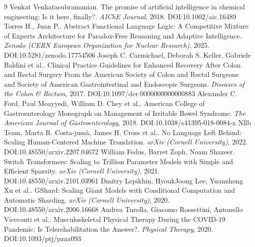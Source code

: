 \documentclass[11pt]{article}
\begin{document}
\begin{thebibliography}{9}
 Venkat Venkatasubramanian. The promise of artificial intelligence in chemical engineering: Is it here, finally?. \emph{AIChE Journal}, 2018. DOI:10.1002/aic.16489
 Torres H., Juan P.. Abstract Functional Language Logic: A Competitive Mixture of Experts Architecture for Paradox-Free Reasoning and Adaptive Intelligence. \emph{Zenodo (CERN European Organization for Nuclear Research)}, 2025. DOI:10.5281/zenodo.17754506
 Joseph C. Carmichael, Deborah S. Keller, Gabriele Baldini et al.. Clinical Practice Guidelines for Enhanced Recovery After Colon and Rectal Surgery From the American Society of Colon and Rectal Surgeons and Society of American Gastrointestinal and Endoscopic Surgeons. \emph{Diseases of the Colon \& Rectum}, 2017. DOI:10.1097/dcr.0000000000000883
 Alexander C. Ford, Paul Moayyedi, William D. Chey et al.. American College of Gastroenterology Monograph on Management of Irritable Bowel Syndrome. \emph{The American Journal of Gastroenterology}, 2018. DOI:10.1038/s41395-018-0084-x
 Nllb Team, Marta R. Costa‐jussà, James H. Cross et al.. No Language Left Behind: Scaling Human-Centered Machine Translation. \emph{arXiv (Cornell University)}, 2022. DOI:10.48550/arxiv.2207.04672
 William Fedus, Barret Zoph, Noam Shazeer. Switch Transformers: Scaling to Trillion Parameter Models with Simple and Efficient Sparsity. \emph{arXiv (Cornell University)}, 2021. DOI:10.48550/arxiv.2101.03961
 Dmitry Lepikhin, HyoukJoong Lee, Yuanzhong Xu et al.. GShard: Scaling Giant Models with Conditional Computation and Automatic Sharding. \emph{arXiv (Cornell University)}, 2020. DOI:10.48550/arxiv.2006.16668
 Andrea Turolla, Giacomo Rossettini, Antonello Viceconti et al.. Musculoskeletal Physical Therapy During the COVID-19 Pandemic: Is Telerehabilitation the Answer?. \emph{Physical Therapy}, 2020. DOI:10.1093/ptj/pzaa093
\end{thebibliography}
\end{document}

